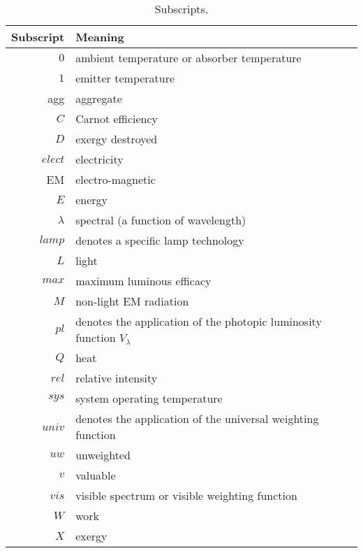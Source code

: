\begin{table}
\centering
\caption{Subscripts.}
\begin{tabular}{r l}
\toprule
Subscript & Meaning \\
\midrule
$0$ & ambient temperature or absorber temperature \\
$1$ & emitter temperature \\
agg & aggregate \\
$C$ & Carnot efficiency \\
$D$ & exergy destroyed \\
$elect$ & electricity \\
EM & electro-magnetic \\
$E$ & energy \\
$\lambda$ & spectral (a function of wavelength) \\
$lamp$ & denotes a specific lamp technology \\
$L$ & light \\
$max$ & maximum luminous efficacy \\
$M$ & non-light EM radiation \\
$pl$ & denotes the application of the photopic luminosity function $V_{\lambda}$ \\
$Q$ & heat \\
$rel$ & relative intensity \\
$sys$ & system operating temperature \\
$univ$ & denotes the application of the universal weighting function \\
$uw$ & unweighted \\
$v$ & valuable \\
$vis$ & visible spectrum or visible weighting function \\
$W$ & work \\
$X$ & exergy \\
\bottomrule
\end{tabular}
\label{tab:subscripts}
\end{table}


